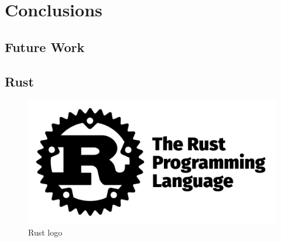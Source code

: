 \chapter{Conclusions}
\label{cha:conclusions}

\section{Future Work}
\label{sec:conclusions_future_work}

\section{Rust}
\label{sec:conclusions_rust}

\begin{figure}
  \centering
  \includegraphics[width=.25\textwidth]{images/logos/rust.png}
  \caption{Rust logo}
\end{figure}